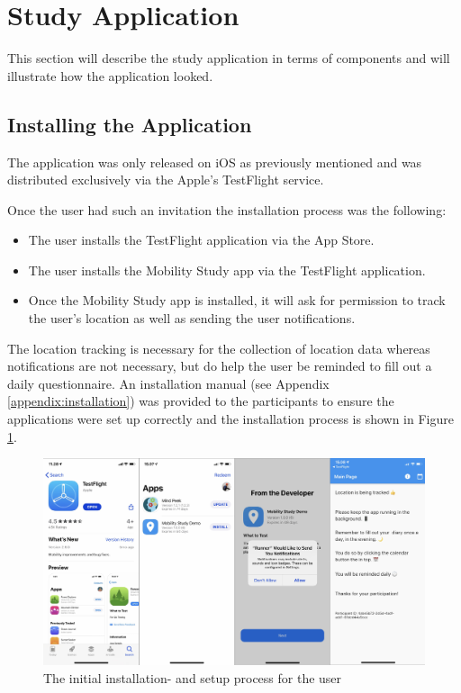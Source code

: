 \section{Study Application}
This section will describe the study application in terms of components and will illustrate how the application looked.

\subsection{Installing the Application}
The application was only released on iOS as previously mentioned and was distributed exclusively via the Apple's TestFlight service. 

Once the user had such an invitation the installation process was the following: 
\begin{itemize}
    
    \item The user installs the TestFlight application via the App Store.
    
    \item The user installs the Mobility Study app via the TestFlight application.
    
    \item Once the Mobility Study app is installed, it will ask for permission to track the user's location as well as sending the user notifications. 
    
\end{itemize}
The location tracking is necessary for the collection of location data whereas notifications are not necessary, but do help the user be reminded to fill out a daily questionnaire. An installation manual (see Appendix \ref{appendix:installation}) was provided to the participants to ensure the applications were set up correctly and the installation process is shown in Figure \ref{fig:screens-install}.

\begin{figure}
    \centering
    \includegraphics[width=\textwidth]{images/app_imgs/screens-install.pdf}
    \caption{The initial installation- and setup process for the user}
    \label{fig:screens-install}
\end{figure}

